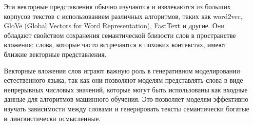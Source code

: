 Эти векторные представления обычно изучаются и извлекаются из больших корпусов текстов с использованием различных алгоритмов, таких как word2vec, GloVe (Global Vectors for Word Representation), FastText и другие. Они обладают свойством сохранения семантической близости слов в пространстве вложения: слова, которые часто встречаются в похожих контекстах, имеют близкие векторные представления.

Векторные вложения слов играют важную роль в генеративном моделировании естественного языка, так как они позволяют моделям представлять слова в виде непрерывных числовых значений, которые могут быть использованы как входные данные для алгоритмов машинного обучения. Это позволяет моделям эффективно изучать зависимости между словами и генерировать тексты семантически богатые и лингвистически осмысленные.







